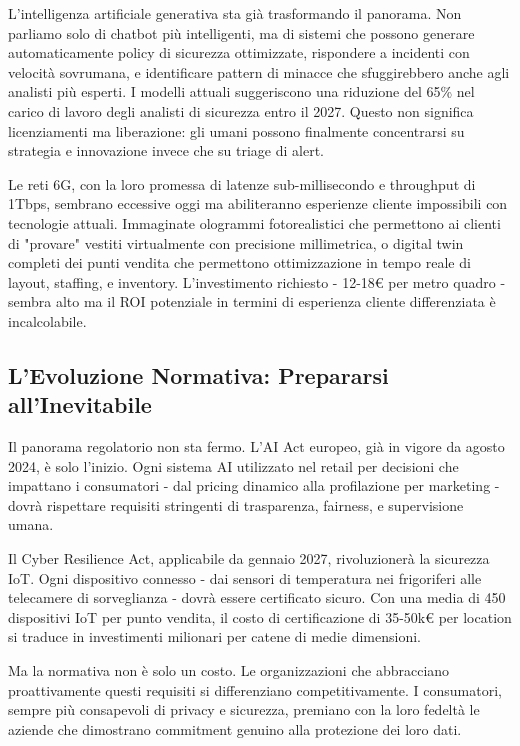L'intelligenza artificiale generativa sta già trasformando il panorama. Non parliamo solo di chatbot più intelligenti, ma di sistemi che possono generare automaticamente policy di sicurezza ottimizzate, rispondere a incidenti con velocità sovrumana, e identificare pattern di minacce che sfuggirebbero anche agli analisti più esperti. I modelli attuali suggeriscono una riduzione del 65\% nel carico di lavoro degli analisti di sicurezza entro il 2027. Questo non significa licenziamenti ma liberazione: gli umani possono finalmente concentrarsi su strategia e innovazione invece che su triage di alert.

Le reti 6G, con la loro promessa di latenze sub-millisecondo e throughput di 1Tbps, sembrano eccessive oggi ma abiliteranno esperienze cliente impossibili con tecnologie attuali. Immaginate ologrammi fotorealistici che permettono ai clienti di "provare" vestiti virtualmente con precisione millimetrica, o digital twin completi dei punti vendita che permettono ottimizzazione in tempo reale di layout, staffing, e inventory. L'investimento richiesto - 12-18€ per metro quadro - sembra alto ma il ROI potenziale in termini di esperienza cliente differenziata è incalcolabile.

\subsection{L'Evoluzione Normativa: Prepararsi all'Inevitabile}

Il panorama regolatorio non sta fermo. L'AI Act europeo, già in vigore da agosto 2024, è solo l'inizio. Ogni sistema AI utilizzato nel retail per decisioni che impattano i consumatori - dal pricing dinamico alla profilazione per marketing - dovrà rispettare requisiti stringenti di trasparenza, fairness, e supervisione umana\autocite{ec2024digital}.

Il Cyber Resilience Act, applicabile da gennaio 2027, rivoluzionerà la sicurezza IoT. Ogni dispositivo connesso - dai sensori di temperatura nei frigoriferi alle telecamere di sorveglianza - dovrà essere certificato sicuro. Con una media di 450 dispositivi IoT per punto vendita, il costo di certificazione di 35-50k€ per location si traduce in investimenti milionari per catene di medie dimensioni.

Ma la normativa non è solo un costo. Le organizzazioni che abbracciano proattivamente questi requisiti si differenziano competitivamente. I consumatori, sempre più consapevoli di privacy e sicurezza, premiano con la loro fedeltà le aziende che dimostrano commitment genuino alla protezione dei loro dati.

